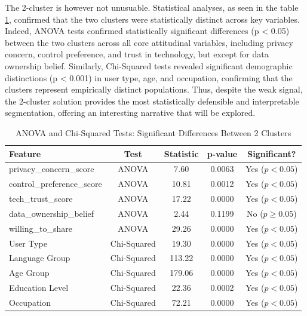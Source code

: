 	The 2-cluster is however not unusuable. Statistical analyses, as seen in the table \ref{tab:cluster_significance}, confirmed that the two clusters were statistically distinct across key variables. Indeed, ANOVA tests confirmed statistically significant differences (p < 0.05) between the two clusters across all core attitudinal variables, including privacy concern, control preference, and trust in technology, but except for data ownership belief. Similarly, Chi-Squared tests revealed significant demographic distinctions (p < 0.001) in user type, age, and occupation, confirming that the clusters represent empirically distinct populations. Thus, despite the weak signal, the 2-cluster solution provides the most statistically defensible and interpretable segmentation, offering an interesting narrative that will be explored.
	\begin{table}[ht]
		\caption{ANOVA and Chi-Squared Tests: Significant Differences Between 2 Clusters}
		\centering
		\begin{tabular}{lcccc}
			\toprule
			\textbf{Feature} & \textbf{Test} & \textbf{Statistic} & \textbf{p-value} & \textbf{Significant?} \\
			\midrule
			privacy\_concern\_score    & ANOVA        & 7.60      & 0.0063  & Yes ($p < 0.05$) \\
			control\_preference\_score & ANOVA        & 10.81     & 0.0012  & Yes ($p < 0.05$) \\
			tech\_trust\_score         & ANOVA        & 17.22     & 0.0000  & Yes ($p < 0.05$) \\
			data\_ownership\_belief    & ANOVA        & 2.44      & 0.1199  & No ($p \geq 0.05$) \\
			willing\_to\_share         & ANOVA        & 29.26     & 0.0000  & Yes ($p < 0.05$) \\
			\midrule
			User Type                  & Chi-Squared  & 19.30     & 0.0000  & Yes ($p < 0.05$) \\
			Language Group             & Chi-Squared  & 113.22    & 0.0000  & Yes ($p < 0.05$) \\
			Age Group                  & Chi-Squared  & 179.06    & 0.0000  & Yes ($p < 0.05$) \\
			Education Level            & Chi-Squared  & 22.36     & 0.0002  & Yes ($p < 0.05$) \\
			Occupation                 & Chi-Squared  & 72.21     & 0.0000  & Yes ($p < 0.05$) \\
			\bottomrule
		\end{tabular}
		\label{tab:cluster_significance}
	\end{table}
